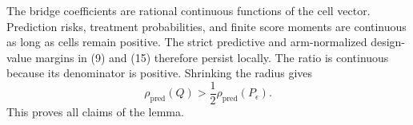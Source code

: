 The bridge coefficients are rational continuous functions of the cell vector. Prediction risks, treatment probabilities, and finite score moments are continuous as long as cells remain positive. The strict predictive and arm-normalized design-value margins in (9) and (15) therefore persist locally. The ratio is continuous because its denominator is positive. Shrinking the radius gives
\[
 \rho_{\mathrm{pred}}(Q)>\frac12\rho_{\mathrm{pred}}(P_\epsilon).
\]
This proves all claims of the lemma.